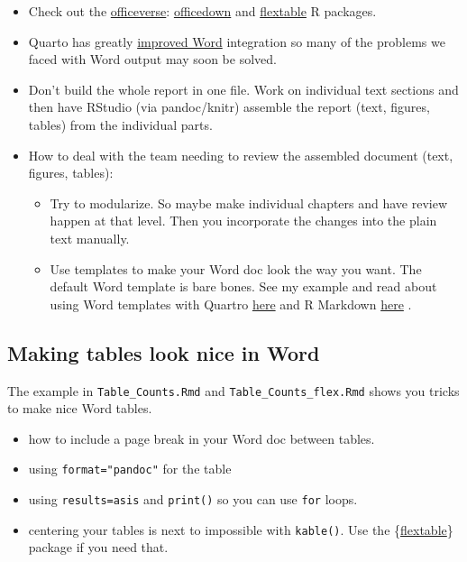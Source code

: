 \documentclass[
  letterpaper,
  oneside]{scrbook}
\providecommand{\tightlist}{%
  \setlength{\itemsep}{0pt}\setlength{\parskip}{0pt}}\usepackage{longtable,booktabs,array}
\begin{document}
\begin{itemize}
\tightlist
\item
  Check out the
  \href{https://ardata-fr.github.io/officeverse/index.html}{officeverse}:
  \href{https://CRAN.R-project.org/package=officedown}{officedown} and
  \href{https://CRAN.R-project.org/package=flextable}{flextable} R
  packages.
\item
  Quarto has greatly
  \href{https://quarto.org/docs/output-formats/ms-word.html}{improved
  Word} integration so many of the problems we faced with Word output
  may soon be solved.
\item
  Don't build the whole report in one file. Work on individual text
  sections and then have RStudio (via pandoc/knitr) assemble the report
  (text, figures, tables) from the individual parts.
\item
  How to deal with the team needing to review the assembled document
  (text, figures, tables):

  \begin{itemize}
  \tightlist
  \item
    Try to modularize. So maybe make individual chapters and have review
    happen at that level. Then you incorporate the changes into the
    plain text manually.
  \item
    Use templates to make your Word doc look the way you want. The
    default Word template is bare bones. See my example and read about
    using Word templates with Quartro
    \href{https://quarto.org/docs/output-formats/ms-word-templates.html}{here}
    and R Markdown
    \href{https://bookdown.org/yihui/rmarkdown-cookbook/word-template.html}{here}
    .
  \end{itemize}
\end{itemize}

\hypertarget{making-tables-look-nice-in-word}{%
\subsection{Making tables look nice in
Word}\label{making-tables-look-nice-in-word}}

The example in \texttt{Table\_Counts.Rmd} and
\texttt{Table\_Counts\_flex.Rmd} shows you tricks to make nice Word
tables.

\begin{itemize}
\tightlist
\item
  how to include a page break in your Word doc between tables.
\item
  using \texttt{format="pandoc"} for the table
\item
  using \texttt{results=\textquotesingle{}asis\textquotesingle{}} and
  \texttt{print()} so you can use \texttt{for} loops.
\item
  centering your tables is next to impossible with \texttt{kable()}. Use
  the \{\href{https://ardata-fr.github.io/flextable-book/}{flextable}\}
  package if you need that.
\end{itemize}
\end{document}
